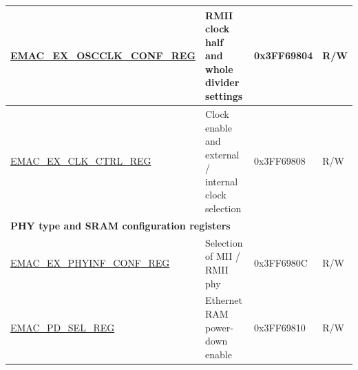 \begin{longtable}{ |m{5cm} |m{6cm} | m{2cm} |m{2.2cm} | }
\hyperref[regdesc:EMACEXOSCCLKCONFREG]{EMAC\_EX\_OSCCLK\_CONF\_REG} & RMII clock half and whole divider settings & 0x3FF69804 & R/W \\ \hline
\hyperref[regdesc:EMACEXCLKCTRLREG]{EMAC\_EX\_CLK\_CTRL\_REG} & Clock enable and external / internal clock selection & 0x3FF69808 & R/W \\ \hline
\multicolumn{4}{|l|}{\textbf{PHY type and SRAM configuration registers}} \\ \hline
\hyperref[regdesc:EMACEXPHYINFCONFREG]{EMAC\_EX\_PHYINF\_CONF\_REG} & Selection of MII / RMII phy & 0x3FF6980C & R/W \\ \hline
\hyperref[regdesc:EMACPDSELREG]{EMAC\_PD\_SEL\_REG} & Ethernet RAM power-down enable & 0x3FF69810 & R/W \\ \hline
\end{longtable}


